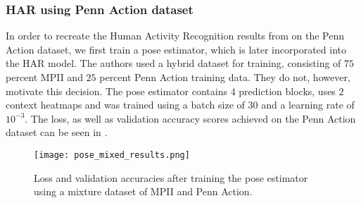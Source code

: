 \begin{table}[]
    \centering
    \caption{Our recreation in direct comparison to the original work by \cite{luvizon_2d/3d_2018}. Values represent PCKh using $\alpha = 0.5$.  } %
    \label{tab:mpii_test}
\end{table}



\subsubsection{HAR using Penn Action dataset}
In order to recreate the Human Activity Recognition results from \cite{luvizon_2d/3d_2018} on the Penn Action dataset, we first train a pose estimator, which is later incorporated into the HAR model.
The authors used a hybrid dataset for training, consisting of $75$ percent MPII and $25$ percent Penn Action training data.
They do not, however, motivate this decision.
The pose estimator contains $4$ prediction blocks, uses $2$ context heatmaps and was trained using a batch size of $30$ and a learning rate of $10^{-3}$.
The loss, as well as validation accuracy scores achieved on the Penn Action dataset can be seen in .

\begin{figure}[htb!]
    \centering
    \texttt{[image: pose\_mixed\_results.png]}
    \caption{Loss and validation accuracies after training the pose estimator using a mixture dataset of MPII and Penn Action.}
    \label{fig:pose_mixed_results}
\end{figure}

